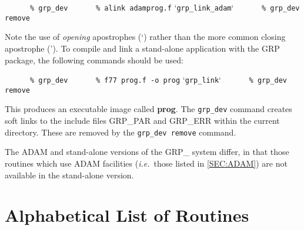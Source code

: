 \small
\verb#      % grp_dev#
\verb#      % alink adamprog.f# `\verb#grp_link_adam#`
\verb#      % grp_dev remove#
\normalsize

Note the use of {\em opening} apostrophes (`) rather than the more common
closing apostrophe ('). To compile and link a stand-alone application with
the GRP package, the following commands should be used:

\small
\verb#      % grp_dev#
\verb#      % f77 prog.f -o prog# `\verb#grp_link#`
\verb#      % grp_dev remove#
\normalsize

This produces an executable image called {\bf prog}. The \verb+grp_dev+
command creates soft links to the include files GRP\_PAR and GRP\_ERR
within the current directory. These are removed by the \verb+grp_dev remove+ command.

The ADAM and stand-alone versions of the GRP\_ system differ, in that those
routines which use ADAM facilities ({\em i.e.}\ those listed in
\ref{SEC:ADAM}) are not available in the stand-alone version.

\appendix
\section{Alphabetical List of Routines}


\newcommand{\noteroutine}[3]{{\small \bf {#1}{#2}} \nopagebreak \\
                             \hspace*{3em} {\em {#3}} \\[1.5ex]}



\begin{htmlonly}

\renewcommand{\noteroutine}[3]{
\begin{description}
\item [{\small \bf {#1}{#2}}] 
{\em #3}
\end{description}
}

\end{htmlonly}




